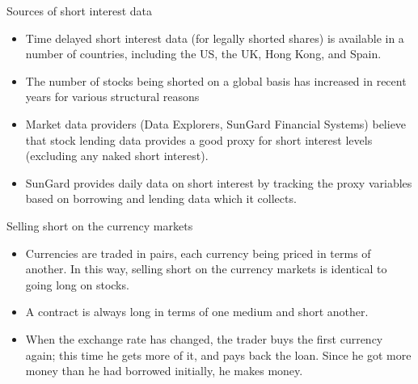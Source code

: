 \documentclass[international_finance_p1.tex]{subfiles}
\begin{document}
\begin{frame}[shrink=15]{Sources of short interest data}
\begin{itemize}[<+->]
\item
Time delayed short interest data (for legally shorted shares) is available in a number of countries, including the US, the UK, Hong Kong, and Spain. 
\item
The number of stocks being shorted on a global basis has increased in recent years for various structural reasons
\item
Market data providers (Data Explorers, SunGard Financial Systems) believe that stock lending data provides a good proxy for short interest levels (excluding any naked short interest). 
\item
SunGard provides daily data on short interest by tracking the proxy variables based on borrowing and lending data which it collects.
\end{itemize}
\end{frame}
\begin{frame}{Selling short on the currency markets }
\begin{itemize}[<+->]
\item
Currencies are traded in pairs, each currency being priced in terms of another. In this way, selling short on the currency markets is identical to going long on stocks.
\item
A contract is always long in terms of one medium and short another.
\item
When the exchange rate has changed, the trader buys the first currency again; this time he gets more of it, and pays back the loan. Since he got more money than he had borrowed initially, he makes money.
\end{itemize}
\end{frame}
\end{document}
